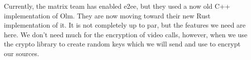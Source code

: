 \documentclass{report}
\begin{document}
Currently, the matrix team has enabled e2ee, but they used a now old C++ implementation of Olm. They are now moving toward their new Rust implementation of it. It is not completely up to par, but the features we need are here. We don't need much for the encryption of video calls, however, when we use the crypto library to create random keys which we will send and use to encrypt our sources.











\end{document}
